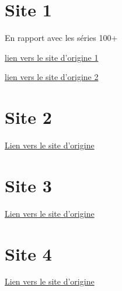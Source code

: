 \documentclass[12pt,a4paper]{exam}%
\begin{document}
\section{Site 1}
En rapport avec les séries 100+\par
\href{https://gist.github.com/KirosG/f265f136bd97bd669632fa0f2f2721b4}{lien vers le site d'origine 1}\par
\href{https://github.com/darkprinx/break-the-ice-with-python}{lien vers le site d'origine 2}
\begin{questions}



%

\end{questions}

\section{Site 2}

\href{https://github.com/4GeeksAcademy/master-python-programming-exercises/tree/master}{Lien vers le site d'origine}\par
\begin{questions}



\end{questions}
\section{Site 3}
\href{https://github.com/dbojado/python-exercises}{Lien vers le site d'origine}\par
\begin{questions}



\end{questions}
\section{Site 4}
\href{https://rtavenar.github.io/exos_python/gen/D_1_%20Objet%20_%20creation%20sans%20parametre.html}{Lien vers le site d'origine}\par
\begin{questions}
	
	
	
\end{questions}
\end{document}
